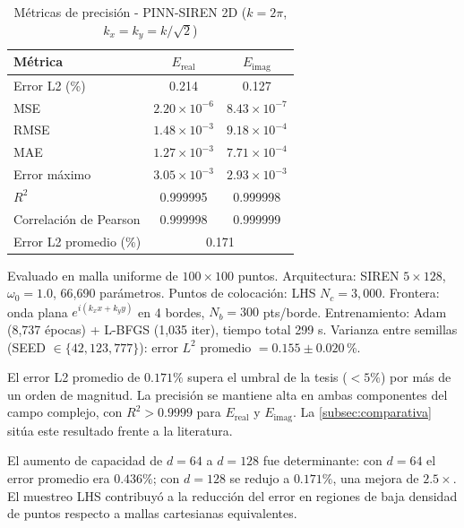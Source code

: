 \begin{table}[htbp]
\centering
\begin{threeparttable}
\caption{Métricas de precisión - PINN-SIREN 2D ($k = 2\pi$, $k_x = k_y = k/\sqrt{2}$)}
\label{tab:resultados2d}
\begin{tabular}{lcc}
\toprule
Métrica & $E_{\mathrm{real}}$ & $E_{\mathrm{imag}}$ \\
\midrule
Error L2 (\%)          & 0.214 & 0.127 \\
MSE                    & $2.20 \times 10^{-6}$ & $8.43 \times 10^{-7}$ \\
RMSE                   & $1.48 \times 10^{-3}$ & $9.18 \times 10^{-4}$ \\
MAE                    & $1.27 \times 10^{-3}$ & $7.71 \times 10^{-4}$ \\
Error máximo           & $3.05 \times 10^{-3}$ & $2.93 \times 10^{-3}$ \\
$R^2$                  & 0.999995 & 0.999998 \\
Correlación de Pearson & 0.999998 & 0.999999 \\
\midrule
Error L2 promedio (\%) & \multicolumn{2}{c}{0.171} \\
\bottomrule
\end{tabular}
\begin{tablenotes}
\small
\item Evaluado en malla uniforme de $100 \times 100$ puntos.
      Arquitectura: SIREN $5 \times 128$, $\omega_0 = 1.0$, 66{,}690 parámetros.
      Puntos de colocación: LHS $N_c = 3{,}000$.
      Frontera: onda plana $e^{i(k_x x + k_y y)}$ en 4 bordes, $N_b = 300$ pts/borde.
      Entrenamiento: Adam (8{,}737 épocas) + L-BFGS (1{,}035 iter), tiempo total 299 s.
      Varianza entre semillas (SEED $\in \{42, 123, 777\}$):
      error $L^2$ promedio $= 0.155 \pm 0.020$\,\%.
\end{tablenotes}
\end{threeparttable}
\end{table}

El error L2 promedio de $0.171\%$ supera el umbral de la tesis ($< 5\%$) por más de un
orden de magnitud. La precisión se mantiene alta en ambas componentes del campo complejo,
con $R^2 > 0.9999$ para $E_{\mathrm{real}}$ y $E_{\mathrm{imag}}$.
La \cref{subsec:comparativa} sitúa este resultado frente a la literatura.

El aumento de capacidad de $d = 64$ a $d = 128$ fue determinante: con $d = 64$ el error
promedio era $0.436\%$; con $d = 128$ se redujo a $0.171\%$, una mejora de $2.5\times$.
El muestreo LHS contribuyó a la reducción del error en regiones de baja densidad de
puntos respecto a mallas cartesianas equivalentes.

